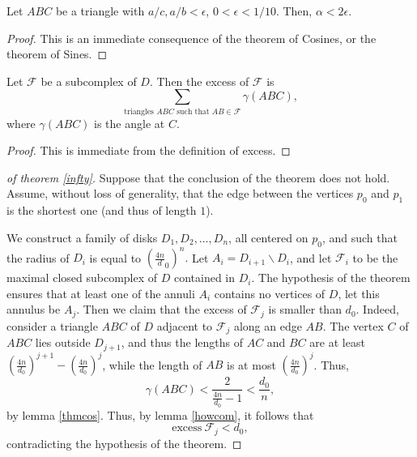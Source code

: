 \documentclass{acmart}
\newcommand{\thm}[2]{\begin{#1} #2 \end{#1}}
\newcommand{\excess}{\mathrm{excess\:}}
\begin{document}
\thm{lemma}
{
\label{thmcos}
Let $ABC$ be a triangle with $a/c, a/b < \epsilon$,  $0<\epsilon
<1/10$. Then, $\alpha < 2\epsilon$.
}

\thm{proof}
{
This is an immediate consequence of the theorem of Cosines, or the
theorem of Sines.
}

\thm{lemma}
{
\label{howcom}
Let $\mathcal{F}$ be a subcomplex of $D$. Then the excess of
$\mathcal{F}$ is 
$$
\sum_{\mbox{triangles $ABC$ such that $AB \in \mathcal{F}$}}\gamma(ABC),
$$
where $\gamma(ABC)$ is the angle at $C$.
}

\thm{proof} 
{
This is immediate from the definition of excess.
}

\begin{proof}[of theorem \ref{infty}]
Suppose that the conclusion of the theorem does not hold. Assume,
without loss of generality, that the edge between the vertices $p_0$
and $p_1$ is the shortest one (and thus of length $1$). 

We construct a family of disks $D_1, D_2,\ldots, D_{n}$, all centered
on $p_0$, and such that the radius of $D_i$ is equal to 
$\left(\frac{4 n} d_0\right)^n.$ Let $A_i = D_{i+1} \backslash D_i$,
and let $\mathcal{F}_i$ to be the maximal closed subcomplex of $D$
contained in $D_i$. The hypothesis of the theorem ensures that at
least one of the annuli $A_i$ contains no vertices of $D$, let this
annulus be $A_j$. Then we claim that the excess of $\mathcal{F}_j$ is
smaller than $d_0$. Indeed, consider a triangle $ABC$ of $D$ adjacent to
$\mathcal{F}_j$ along an edge $AB$. The vertex $C$ of $ABC$ lies
outside $D_{j+1}$, and thus the lengths of $AC$ and $BC$ are at least 
$\left(\frac{4n}{d_0}\right)^{j+1} - \left(\frac{4n}{d_0}\right)^j $,
while the length of $AB$ is at most $\left(\frac{4n}{d_0}\right)^j$.
Thus, 
$$\gamma(ABC) < \frac{2}{\frac{4n}{d_0} - 1} < \frac{d_0}{n},$$
by lemma \ref{thmcos}. Thus, by lemma \ref{howcom}, it follows that 
$$\excess \mathcal{F}_j < d_0,$$
contradicting the hypothesis of the theorem.
\end{proof}
\end{document}
